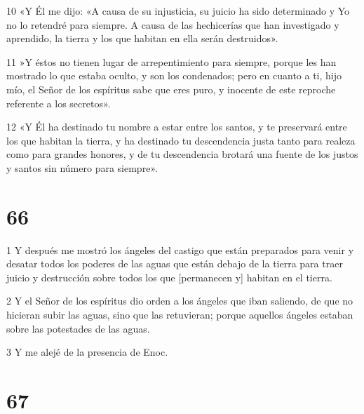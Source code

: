 \par 10 «Y Él me dijo: «A causa de su injusticia, su juicio ha sido determinado y Yo no lo retendré para siempre. A causa de las hechicerías que han investigado y aprendido, la tierra y los que habitan en ella serán destruidos».
\par 11 »Y éstos no tienen lugar de arrepentimiento para siempre, porque les han mostrado lo que estaba oculto, y son los condenados; pero en cuanto a ti, hijo mío, el Señor de los espíritus sabe que eres puro, y inocente de este reproche referente a los secretos».
\par 12 «Y Él ha destinado tu nombre a estar entre los santos, y te preservará entre los que habitan la tierra, y ha destinado tu descendencia justa tanto para realeza como para grandes honores, y de tu descendencia brotará una fuente de los justos y santos sin número para siempre».

\chapter{66}

\par 1 Y después me mostró los ángeles del castigo que están preparados para venir y desatar todos los poderes de las aguas que están debajo de la tierra para traer juicio y destrucción sobre todos los que [permanecen y] habitan en el tierra.
\par 2 Y el Señor de los espíritus dio orden a los ángeles que iban saliendo, de que no hicieran subir las aguas, sino que las retuvieran; porque aquellos ángeles estaban sobre las potestades de las aguas.
\par 3 Y me alejé de la presencia de Enoc.

\chapter{67}

